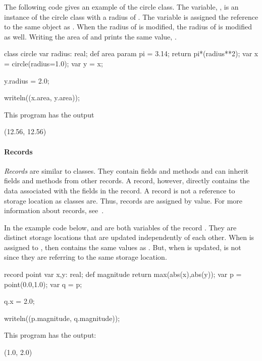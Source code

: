 \begin{example}
The following code gives an example of the circle class.  
The variable, , is an instance of the circle class with
a radius of .  The variable  is assigned the 
reference to the same object as .  When the radius of  is
modified, the radius of  is modified as well.  Writing the area
of  and  prints the same value, .
\begin{chapel}
class circle {
  var radius: real;
  def area {
    param pi = 3.14;
    return pi*(radius**2);
  }
}
var x = circle(radius=1.0);
var y = x;

y.radius = 2.0;

writeln((x.area, y.area));
\end{chapel}

This program has the output
\begin{commandline}
(12.56, 12.56)
\end{commandline}
\end{example}

\paragraph{Records}
\emph{Records} are similar to classes.  They contain fields and methods
and can inherit fields and methods from other records.  A record,
however, directly contains the data associated with the fields
in the record.  A record is not a reference to storage location as
classes are.  Thus, records are assigned by value.  For more information
about records, see~.

\begin{example}
In the example code below,  and  are both
variables of the record .  They are distinct storage
locations that are updated independently of each other.
When  is assigned to ,  then contains the
same values as .  But, when  is updated, 
is not since they are referring to the same storage location.

\begin{chapel}
record point {
  var x,y: real;
  def magnitude {
    return max(abs(x),abs(y));
  }
}
var p = point(0.0,1.0);
var q = p;

q.x = 2.0;

writeln((p.magnitude, q.magnitude));
\end{chapel}

This program has the output:

\begin{commandline}
(1.0, 2.0)
\end{commandline}
\end{example}

